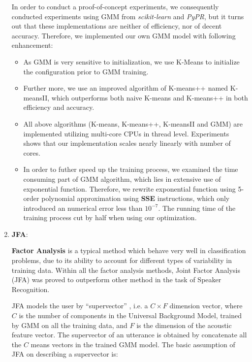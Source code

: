\begin{enumerate}
			In order to conduct a proof-of-concept experiments, we consequently conducted
			experiments using GMM from \textit{scikit-learn}\cite{scikit-learn}
			and \textit{PyPR}\cite{pypr}, but it turns out that these implementations
			are neither of efficiency, nor of decent accuracy. Therefore, we implemented
			our own GMM model with following enhancement:
			\begin{itemize}
				\item As GMM is very sensitive to initialization, we use
					K-Means to initialize the configuration prior to GMM training.
				\item Further more, we use an improved algorithm of
					K-means++\cite{arthur2007k} named K-meansII\cite{bahmani2012scalable},
					which outperforms both naive K-means and K-means++ in both
					efficiency and accuracy.
				\item All above algorithms (K-means, K-means++, K-meansII and
					GMM) are implemented utilizing multi-core CPUs in
					thread level. Experiments shows that our implementation
					scales nearly linearly with number of cores.
				\item In order to futher speed up the training process,
					we examined the time consuming part of GMM algorithm,
					which lies in extensive use of exponential function.
					Therefore, we rewrite exponential function using 5-order polynomial
					approximation using \textbf{SSE} instructions, which only
					introduced an numerical error less than $10^{-7}$.
					The running time of the training process cut by half when using
					our optimization.
			\end{itemize}


		\item \textbf{JFA}:

          \textbf{Factor Analysis} is a typical method which behave
          very well in classification problems, due to its ability to
          account for different types of variability in training data.
          Within all the factor analysis methods,
          Joint Factor Analysis (JFA)\cite{jfa2,jfa-se} was proved to outperform other method
          in the task of Speaker Recognition.

          JFA models the user by ``supervector'' , i.e. a $C\times F $ dimension vector, where $C$ is
          the number of components in the Universal Background Model, trained by GMM on all the training data,
          and $ F$ is the dimension of the acoustic feature vector. The supervector of an utterance is obtained by concatenate
          all the $C $ means vectors in the trained GMM model. The basic assumption of JFA on describing a supervector is:


\end{enumerate}
